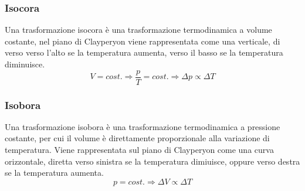 \documentclass{article}
\numberwithin{equation}{subsection}
\begin{document}
\subsubsection{Isocora}
Una trasformazione isocora è una trasformazione termodinamica 
a volume costante, nel piano di Clayperyon viene rappresentata 
come una verticale, di verso verso l'alto se la temperatura 
aumenta, verso il basso se la temperatura diminuisce. 
\begin{equation}
    V=cost.\Rightarrow
    \displaystyle\frac{p}{T}=cost.\Rightarrow
    \Delta p \propto\Delta T
\end{equation}

\begin{center}\end{center}

\subsubsection{Isobora}
Una trasformazione isobora è una trasformazione 
termodinamica a pressione costante, per cui il 
volume è direttamente proporzionale alla variazione di 
temperatura. Viene rappresentata sul piano di Clayperyon come 
una curva orizzontale, diretta verso sinistra se la 
temperatura dimiuisce, oppure verso destra se la temperatura 
aumenta. 
\begin{equation}
    p=cost.\Rightarrow \Delta V\propto\Delta T
\end{equation}

\begin{center}\end{center}
\end{document}
